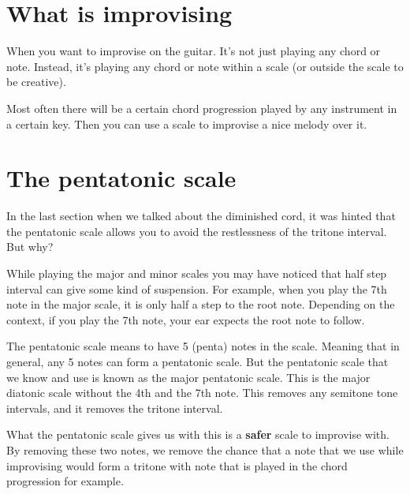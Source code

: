 \section{What is improvising}

When you want to improvise on the guitar. It's not just playing any chord or note. Instead, it's playing any chord or note within a scale (or outside the scale to be creative).

Most often there will be a certain chord progression played by any instrument in a certain key. Then you can use a scale to improvise a nice melody over it.

\section{The pentatonic scale}

In the last section when we talked about the diminished cord, it was hinted that the pentatonic scale allows you to avoid the restlessness of the tritone interval. But why?

While playing the major and minor scales you may have noticed that half step interval can give some kind of suspension. For example, when you play the 7th note in the major scale, it is only half a step to the root note. Depending on the context, if you play the 7th note, your ear expects the root note to follow.

The pentatonic scale means to have 5 (penta) notes in the scale. Meaning that in general, any 5 notes can form a pentatonic scale. But the pentatonic scale that we know and use is known as the major pentatonic scale. This is the major diatonic scale without the 4th and the 7th note. This removes any semitone tone intervals, and it removes the tritone interval.


What the pentatonic scale gives us with this is a \textbf{safer} scale to improvise with. By removing these two notes, we remove the chance that a note that we use while improvising would form a tritone with note that is played in the chord progression for example.

